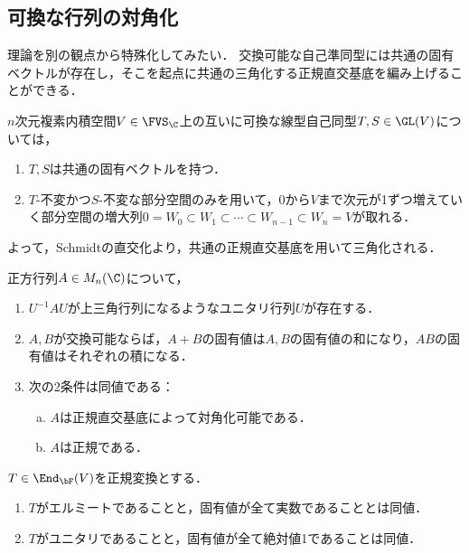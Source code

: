 \documentclass[uplatex, dvipdfmx]{jsreport}
\begin{document}
\subsection{可換な行列の対角化}

\begin{tcolorbox}[colframe=ForestGreen, colback=ForestGreen!10!white,breakable,colbacktitle=ForestGreen!40!white,coltitle=black,fonttitle=\bfseries\sffamily,
title=]
    理論を別の観点から特殊化してみたい．
    交換可能な自己準同型には共通の固有ベクトルが存在し，そこを起点に共通の三角化する正規直交基底を編み上げることができる．
\end{tcolorbox}

\begin{theorem}[可換な線形変換に対して空間上で起こっている消息]
    $n$次元複素内積空間$V\in\FVS_\C$上の互いに可換な線型自己同型$T,S\in\GL(V)$については，
    \begin{enumerate}
        \item $T,S$は共通の固有ベクトルを持つ．
        \item $T$-不変かつ$S$-不変な部分空間のみを用いて，$0$から$V$まで次元が1ずつ増えていく部分空間の増大列$0=W_0\subset W_1\subset\cdots\subset W_{n-1}\subset W_n=V$が取れる．
    \end{enumerate}
    よって，Schmidtの直交化より，共通の正規直交基底を用いて三角化される．
\end{theorem}

\begin{corollary}[正規性の対角化可能性による特徴付け]
    正方行列$A\in M_n(\C)$について，
    \begin{enumerate}
        \item $U^{-1}AU$が上三角行列になるようなユニタリ行列$U$が存在する．
        \item $A,B$が交換可能ならば，$A+B$の固有値は$A,B$の固有値の和になり，$AB$の固有値はそれぞれの積になる．
        \item 次の2条件は同値である：
        \begin{enumerate}[(a)]
            \item $A$は正規直交基底によって対角化可能である．
            \item $A$は正規である．
        \end{enumerate}
    \end{enumerate}
\end{corollary}

\begin{corollary}[スペクトル定理の系]
    $T\in\End_\bF(V)$を正規変換とする．
    \begin{enumerate}
        \item $T$がエルミートであることと，固有値が全て実数であることとは同値．
        \item $T$がユニタリであることと，固有値が全て絶対値1であることは同値．
    \end{enumerate}
\end{corollary}
\end{document}
